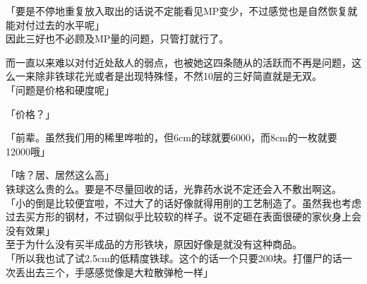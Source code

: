 「要是不停地重复放入取出的话说不定能看见MP变少，不过感觉也是自然恢复就能对付过去的水平呢」\\

因此三好也不必顾及MP量的问题，只管打就行了。

而一直以来难以对付近处敌人的弱点，也被她这四条随从的活跃而不再是问题，这么一来除非铁球花光或者是出现特殊怪，不然10层的三好简直就是无双。\\

「问题是价格和硬度呢」

「价格？」

「前辈。虽然我们用的稀里哗啦的，但6cm的球就要6000，而8cm的一枚就要12000哦」

「啥？居、居然这么高」\\

铁球这么贵的么。要是不尽量回收的话，光靠药水说不定还会入不敷出啊这。\\

「小的倒是比较便宜啦，不过大了的话好像就得用削的工艺制造了。虽然我也考虑过去买方形的钢材，不过钢似乎比较软的样子。说不定砸在表面很硬的家伙身上会没有效果」\\

至于为什么没有买半成品的方形铁块，原因好像是就没有这种商品。\\

「所以我也试了试2.5cm的低精度铁球。这个的话一个只要200块。打僵尸的话一次丢出去三个，手感感觉像是大粒散弹枪一样」\\

